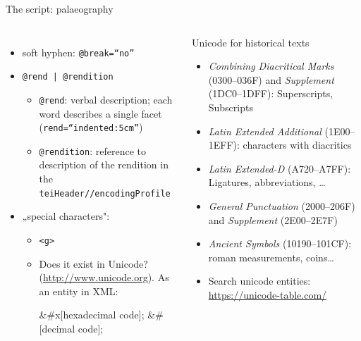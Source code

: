 \begin{frame}[fragile]{The script: palaeography}

\begin{columns}
\begin{itemize}
\item  soft hyphen: \texttt{@break=“no”}
\item  \texttt{@rend | @rendition}
\begin{itemize}
    \item \texttt{@rend}: verbal description; each word describes a single facet (\texttt{rend=“indented:5cm”})
    \item \texttt{@rendition}: reference to description of the rendition in the \texttt{teiHeader//encodingProfile}
\end{itemize}
\item  „special characters":
\begin{itemize}
    \item \texttt{<g>}
    \item Does it exist in Unicode? (\protect\url{http://www.unicode.org}). As an entity in XML:
\begin{xmlcode}
&#x[hexadecimal code];
&#[decimal code];
\end{xmlcode}
\end{itemize}
\end{itemize}

\begin{block}{Unicode for historical texts}\scriptsize
\begin{itemize}
\item  \emph{Combining Diacritical Marks} (0300–036F) and \emph{Supplement} (1DC0–1DFF): Superscripts, Subscripts
\item  \emph{Latin Extended Additional} (1E00–1EFF): characters with diacritics
\item  \emph{Latin Extended-D} (A720–A7FF): Ligatures, abbreviations, \dots
\item  \emph{General Punctuation} (2000–206F) and \emph{Supplement} (2E00–2E7F)%
\item  \emph{Ancient Symbols} (10190–101CF): roman measurements, coins\dots
\item Search unicode entities: \protect\url{https://unicode-table.com/}
\end{itemize}
\end{block}
\end{columns}


\end{frame}
